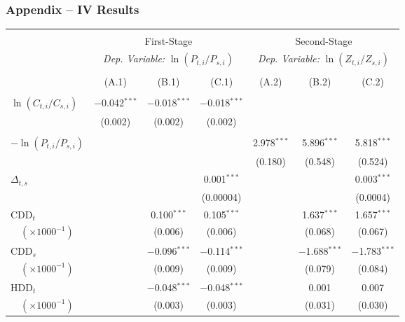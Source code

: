 \documentclass[aspectratio=169]{beamer}
\begin{document}
\begin{frame}
\frametitle{Appendix -- IV Results}

\begin{table}[h] \centering 
	\label{table:2} 
	\tiny
	\begin{tabular}{@{\extracolsep{4pt}}lcccccc} 
		\\[-4ex]\hline  
		\hline \\[-1.6ex] 
		& \multicolumn{3}{c}{First-Stage} & \multicolumn{3}{c}{Second-Stage} \\ [0.5ex]
		& \multicolumn{3}{c}{\textit{Dep. Variable:} $\ln (P_{t,i} / P_{s,i})$ } & \multicolumn{3}{c}{\textit{Dep. Variable:}  $\ln (Z_{ t, i} / Z_{ s, i})$}\\ [0.5ex]
		\cmidrule(lr){2-4} \cmidrule(lr){5-7}\\[-2.9ex] 
		& (A.1) & (B.1) & (C.1) & (A.2) & (B.2) & (C.2)\\ [0.5ex]
		\hline \\[-1.8ex] 
		$ \ln (C_{t,i} / C_{s,i})$ & $-$0.042$^{***}$ & $-$0.018$^{***}$ & $-$0.018$^{***}$ &  &  &  \\ 
		& (0.002) & (0.002) & (0.002) &  &  &  \\ 
		& & & & & & \\[-1ex]
		$-\ln (P_{t,i} / P_{s,i})$ &  &  &  & 2.978$^{***}$ & 5.896$^{***}$ & 5.818$^{***}$ \\ 
		&  &  &  & (0.180) & (0.548) & (0.524) \\   
		$\Delta_{t,s}$  &  &  & 0.001$^{***}$ &  &  & 0.003$^{***}$ \\ 
		&  &  & (0.00004) &  &  & (0.0004) \\ 
		CDD$_t$  &  & 0.100$^{***}$ & 0.105$^{***}$ &  & 1.637$^{***}$ & 1.657$^{***}$ \\ 
		$\quad(\times 1000^{-1})$ &  & (0.006) & (0.006) &  & (0.068) & (0.067) \\ 
		CDD$_s$ &  & $-$0.096$^{***}$ & $-$0.114$^{***}$ &  & $-$1.688$^{***}$ & $-$1.783$^{***}$ \\ 
		$\quad(\times 1000^{-1})$  &  & (0.009) & (0.009) &  & (0.079) & (0.084) \\ 
		HDD$_t$  &  & $-$0.048$^{***}$ & $-$0.048$^{***}$ &  & 0.001 & 0.007 \\ 
		$\quad(\times 1000^{-1})$ &  & (0.003) & (0.003) &  & (0.031) & (0.030) \\ 

\end{tabular}
\end{table}
\end{frame}
\end{document}

